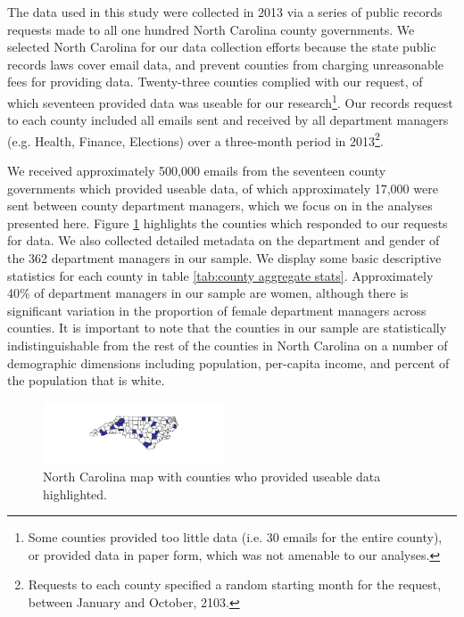 \documentclass{pnastwo}
\begin{document}
\begin{article}
The data used in this study were collected in 2013 via a series of public records requests made to all one hundred North Carolina county governments. We selected North Carolina for our data collection efforts because the state public records laws cover email data, and prevent counties from charging unreasonable fees for providing data. Twenty-three counties complied with our request, of which seventeen provided data was useable for our research\footnote{Some counties provided too little data (i.e. 30 emails for the entire county), or provided data in paper form, which was not amenable to our analyses.}. Our records request to each county included all emails sent and received by all department managers (e.g. Health, Finance, Elections) over a three-month period in 2013\footnote{Requests to each county specified a random starting month for the request, between January and October, 2103.}. 

We received approximately 500,000 emails from the seventeen county governments which provided useable data, of which approximately 17,000 were sent between county department managers, which we focus on in the analyses presented here. Figure \ref{fig:nc map} highlights the counties which responded to our requests for data. We also collected detailed metadata on the department and gender of the 362 department managers in our sample. We display some basic descriptive statistics for each county in table \ref{tab:county aggregate stats}. Approximately 40\% of department managers in our sample are women, although there is significant variation in the proportion of female department managers across counties. It is important to note that the counties in our sample are statistically indistinguishable from the rest of the counties in North Carolina on a number of demographic dimensions including population, per-capita income, and percent of the population that is white.


	\begin{figure}
		\centering
	\caption{\label{fig:nc map} North Carolina map with counties who provided useable data highlighted.}	
	\centering
	\includegraphics[width = 0.48\textwidth]{images/County_Map.pdf}
	\end{figure}
	

\end{article}
\end{document}
